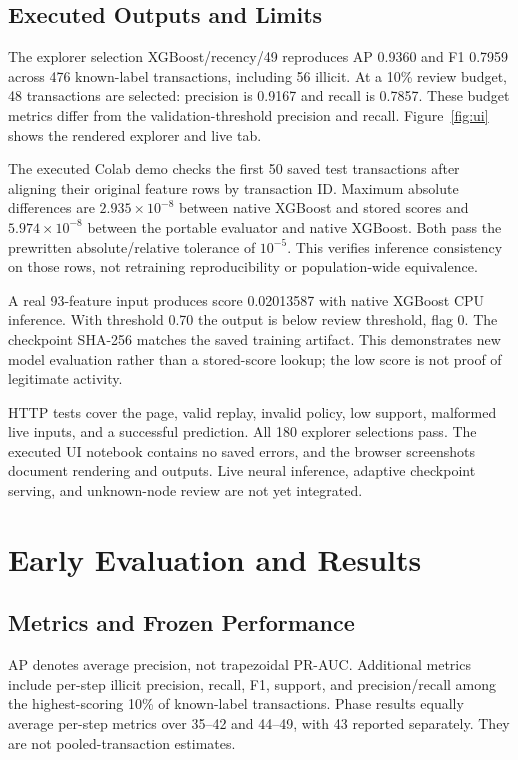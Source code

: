 \documentclass[conference]{IEEEtran}
\begin{document}
\subsection{Executed Outputs and Limits}
The explorer selection XGBoost/recency/49 reproduces AP 0.9360 and F1 0.7959 across 476 known-label transactions, including 56 illicit. At a 10\% review budget, 48 transactions are selected: precision is 0.9167 and recall is 0.7857. These budget metrics differ from the validation-threshold precision and recall. Figure~\ref{fig:ui} shows the rendered explorer and live tab.

The executed Colab demo checks the first 50 saved test transactions after aligning their original feature rows by transaction ID. Maximum absolute differences are $2.935\times10^{-8}$ between native XGBoost and stored scores and $5.974\times10^{-8}$ between the portable evaluator and native XGBoost. Both pass the prewritten absolute/relative tolerance of $10^{-5}$. This verifies inference consistency on those rows, not retraining reproducibility or population-wide equivalence.

A real 93-feature input produces score 0.02013587 with native XGBoost CPU inference. With threshold 0.70 the output is below review threshold, flag 0. The checkpoint SHA-256 matches the saved training artifact. This demonstrates new model evaluation rather than a stored-score lookup; the low score is not proof of legitimate activity.

HTTP tests cover the page, valid replay, invalid policy, low support, malformed live inputs, and a successful prediction. All 180 explorer selections pass. The executed UI notebook contains no saved errors, and the browser screenshots document rendering and outputs. Live neural inference, adaptive checkpoint serving, and unknown-node review are not yet integrated.

\section{Early Evaluation and Results}
\subsection{Metrics and Frozen Performance}
AP denotes average precision, not trapezoidal PR-AUC. Additional metrics include per-step illicit precision, recall, F1, support, and precision/recall among the highest-scoring 10\% of known-label transactions. Phase results equally average per-step metrics over 35--42 and 44--49, with 43 reported separately. They are not pooled-transaction estimates.
\end{document}
